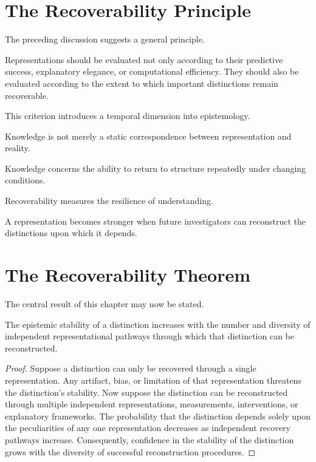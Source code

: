 \documentclass[11pt,oneside,openany]{book}
\begin{document}
\section{The Recoverability Principle}

The preceding discussion suggests a general principle.

Representations should be evaluated not only according to their predictive success, explanatory elegance, or computational efficiency. They should also be evaluated according to the extent to which important distinctions remain recoverable.

This criterion introduces a temporal dimension into epistemology.

Knowledge is not merely a static correspondence between representation and reality.

Knowledge concerns the ability to return to structure repeatedly under changing conditions.

Recoverability measures the resilience of understanding.

A representation becomes stronger when future investigators can reconstruct the distinctions upon which it depends.

\section{The Recoverability Theorem}

The central result of this chapter may now be stated.

\begin{theorem}

The epistemic stability of a distinction increases with the number and diversity of independent representational pathways through which that distinction can be reconstructed.

\end{theorem}

\begin{proof}

Suppose a distinction can only be recovered through a single representation. Any artifact, bias, or limitation of that representation threatens the distinction's stability. Now suppose the distinction can be reconstructed through multiple independent representations, measurements, interventions, or explanatory frameworks. The probability that the distinction depends solely upon the peculiarities of any one representation decreases as independent recovery pathways increase. Consequently, confidence in the stability of the distinction grows with the diversity of successful reconstruction procedures.

\end{proof}
\end{document}

